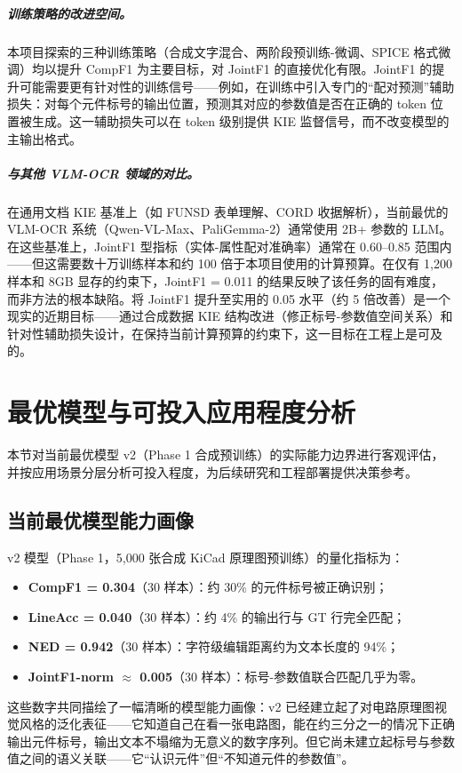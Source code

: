 \subparagraph{训练策略的改进空间。}
本项目探索的三种训练策略（合成文字混合、两阶段预训练-微调、SPICE 格式微调）均以提升 CompF1 为主要目标，对 JointF1 的直接优化有限。JointF1 的提升可能需要更有针对性的训练信号——例如，在训练中引入专门的``配对预测''辅助损失：对每个元件标号的输出位置，预测其对应的参数值是否在正确的 token 位置被生成。这一辅助损失可以在 token 级别提供 KIE 监督信号，而不改变模型的主输出格式。

\subparagraph{与其他 VLM-OCR 领域的对比。}
在通用文档 KIE 基准上（如 FUNSD 表单理解、CORD 收据解析），当前最优的 VLM-OCR 系统（Qwen-VL-Max、PaliGemma-2）通常使用 2B+ 参数的 LLM。在这些基准上，JointF1 型指标（实体-属性配对准确率）通常在 0.60--0.85 范围内——但这需要数十万训练样本和约 100 倍于本项目使用的计算预算。在仅有 1,200 样本和 8GB 显存的约束下，JointF1 = 0.011 的结果反映了该任务的固有难度，而非方法的根本缺陷。将 JointF1 提升至实用的 0.05 水平（约 5 倍改善）是一个现实的近期目标——通过合成数据 KIE 结构改进（修正标号-参数值空间关系）和针对性辅助损失设计，在保持当前计算预算的约束下，这一目标在工程上是可及的。

\section{最优模型与可投入应用程度分析}

本节对当前最优模型 v2（Phase 1 合成预训练）的实际能力边界进行客观评估，并按应用场景分层分析可投入程度，为后续研究和工程部署提供决策参考。

\subsection{当前最优模型能力画像}

v2 模型（Phase 1，5,000 张合成 KiCad 原理图预训练）的量化指标为：
\begin{itemize}[nosep]
    \item \textbf{CompF1 = 0.304}（30 样本）：约 30\% 的元件标号被正确识别；
    \item \textbf{LineAcc = 0.040}（30 样本）：约 4\% 的输出行与 GT 行完全匹配；
    \item \textbf{NED = 0.942}（30 样本）：字符级编辑距离约为文本长度的 94\%；
    \item \textbf{JointF1-norm $\approx$ 0.005}（30 样本）：标号-参数值联合匹配几乎为零。
\end{itemize}

这些数字共同描绘了一幅清晰的模型能力画像：v2 已经建立起了对电路原理图视觉风格的泛化表征——它知道自己在看一张电路图，能在约三分之一的情况下正确输出元件标号，输出文本不塌缩为无意义的数字序列。但它尚未建立起标号与参数值之间的语义关联——它``认识元件''但``不知道元件的参数值''。

